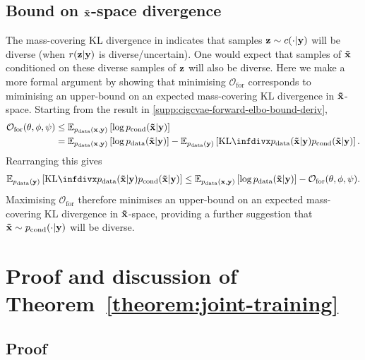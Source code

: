 \subsection{Bound on $\mathbf{\tilde{x}}{}$-space divergence}
The mass-covering KL divergence in  indicates that
samples $\mathbf{z}{}\sim c{}(\cdot|\mathbf{y}{})$ will be diverse (when $r(\mathbf{z}{}|\mathbf{y}{})$ is
diverse/uncertain). One would expect that samples of $\mathbf{\tilde{x}}{}$ conditioned on these
diverse samples of $\mathbf{z}{}$ will also be diverse. Here we make a more formal argument
by showing that minimising $\mathcal{O}_\mathrm{for}$ corresponds to miminising
an upper-bound on an expected mass-covering KL divergence in $\mathbf{\tilde{x}}{}$-space.
Starting from the result in \cref{supp:cigcvae-forward-elbo-bound-deriv},
\begin{align}
  \mathcal{O}_\mathrm{for}(\theta, \phi, \partphi{}) &\leq \EX_{\pdata{}(\I{},\partI{})} \left[ \log \pcomp{}(\tildeI{}|\partI{}) \right] \\
                                                     &= \EX_{\pdata{}(\I{},\partI{})} \left[ \log \pdata{}(\tildeI{}|\partI{}) \right] - \EX_{\pdata{}(\partI{})}\left[ \kl{\pdata{}(\tildeI{}|\partI{})}{\pcomp{}(\tildeI{}|\partI{})} \right].
\end{align}
Rearranging this gives
\begin{align}
  \EX_{\pdata{}(\partI{})}\left[ \kl{\pdata{}(\tildeI{}|\partI{})}{\pcomp{}(\tildeI{}|\partI{})} \right]  \leq \EX_{\pdata{}(\I{},\partI{})} \left[ \log \pdata{}(\tildeI{}|\partI{}) \right] - \mathcal{O}_\mathrm{for}(\theta, \phi, \partphi{}).
\end{align}
Maximising $\mathcal{O}_\mathrm{for}$ therefore minimises an upper-bound on an
expected mass-covering KL divergence in $\mathbf{\tilde{x}}{}$-space, providing a further suggestion that
$\mathbf{\tilde{x}}{}\sim p_{\text{cond}}{}(\cdot|\mathbf{y}{})$ will be diverse.


\section{Proof and discussion of Theorem~\ref{theorem:joint-training}}  \label{proof:joint-training}
\subsection{Proof}

